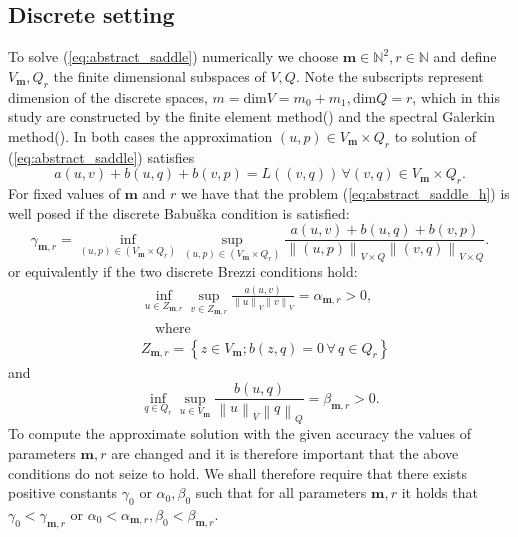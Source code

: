 \documentclass[a4paper,10pt]{article}
\newcommand{\norm}[1]{\ensuremath{\left\|#1\right\|}}
\newcommand{\mm}{\ensuremath{\mathbf{m}}}
\begin{document}
  \subsection{Discrete setting}
  To solve (\ref{eq:abstract_saddle}) numerically we choose $\mm\in\mathbb{N}^2, 
r\in\mathbb{N}$ and define $V_\mm, Q_r$ the finite dimensional subspaces
of $V, Q$. Note the subscripts represent dimension of the discrete spaces,
$m=\text{dim}{V}=m_0+m_1, \text{dim}{Q}=r$, which in this study are constructed
by the finite element method(\cite{scott}) and the spectral Galerkin
method(\cite{shen_book}). In both cases
the approximation $(u, p)\in V_{\mm}\times Q_r$ 
to solution of (\ref{eq:abstract_saddle}) satisfies
  \begin{equation}
    \label{eq:abstract_saddle_h}
    a(u, v) + b(u, q) + b(v, p) = L((v, q))\,\forall (v, q) \in V_{\mm}\times Q_r.
  \end{equation}
  For fixed values of $\mm$ and $r$ we have that the problem
  (\ref{eq:abstract_saddle_h}) is well posed if the discrete Babu\v ska condition
  is satisfied:
  \begin{equation}
    \label{eq:babuska_h}
    \gamma_{\mm, r}=\inf_{(u, p)\in \left(V_{\mm}\times Q_r\right)}
    \sup_{(u, p)\in \left(V_{\mm}\times Q_r\right)}
    \frac{a(u, v) + b(u, q) + b(v, p)}
    {\norm{(u, p)}_{V\times Q}  \norm{(v, q)}_{V\times Q}}.
  \end{equation}
  or equivalently if the two discrete Brezzi conditions hold:
  \begin{equation}
    \label{eq:brezzi_coer_h}
    \begin{aligned}
      &\inf_{u\in Z_{\mm, r}}
    \sup_{v\in Z_{\mm, r}}
    \frac{a(u,v)}{\norm{u}_V\norm{v}_V} = \alpha_{\mm, r} > 0,\\
    &\quad\text{where}\\
    & Z_{\mm, r} = \left\{z\in V_{\mm}; b(z, q)=0\,\forall\,q\in Q_r\right\}
    \end{aligned}
  \end{equation}
  and 
  \begin{equation}
    \label{eq:brezzi_infsup_h}
    \inf_{q\in Q_r}\sup_{u \in V_\mm} \frac{b(u, q)}{\norm{u}_V\norm{q}_Q}
    = \beta _{\mm, r}> 0.
  \end{equation}
  To compute the approximate solution with the given accuracy the values of
  parameters $\mm, r$ are changed and it is therefore important that
  the above conditions do not seize to hold. We shall therefore require that
  there exists positive constants $\gamma_0$ or $\alpha_0, \beta_0$ such that
  for all parameters $\mm, r$ it holds that $\gamma_0<\gamma_{\mm, r}$ or
  $\alpha_0<\alpha_{\mm, r}, \beta_0<\beta_{\mm, r}$.
 
\end{document}
